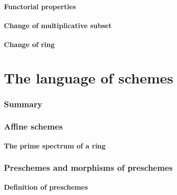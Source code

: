 \documentclass[10pt,oneside]{amsart}
\begin{document}
        \subsection{Functorial properties}
        

        \subsection{Change of multiplicative subset}
        

        \subsection{Change of ring}
        

\clearpage


\setcounter{subsection}{0}
\part{The language of schemes}
    
    \section*{Summary}
    

    \section{Affine schemes}
       
       \subsection{The prime spectrum of a ring}



    \section{Preschemes and morphisms of preschemes}

        \subsection{Definition of preschemes}
        
\end{document}
